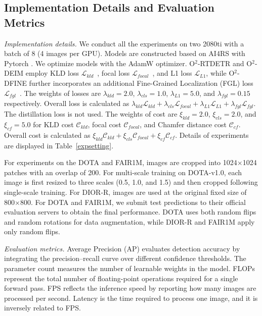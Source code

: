 \documentclass[lettersize,journal]{IEEEtran}
\begin{document}
\DOTAOneResults

\subsection{Implementation Details and Evaluation Metrics}

\textit{Implementation details.}
We conduct all the experiments on two \textcolor[HTML]{76B900}{} 2080ti with a batch of 8 (4 images per GPU). Models are constructed based on AI4RS with Pytorch \textcolor[HTML]{EE4C2C}{}. We optimize models with the AdamW optimizer. O$^2$-RTDETR and O$^2$-DEIM employ KLD loss $\mathcal{L}_{kld}$~\cite{kld}, focal loss $\mathcal{L}_{focal}$~\cite{deim}, and L1 loss $\mathcal{L}_{L1}$, while O$^2$-DFINE further incorporates an additional Fine-Grained Localization (FGL) loss $\mathcal{L}_{fgl}$~\cite{dfine}. The weights of losses are $\lambda_{kld}=2.0$, $\lambda_{cls}=1.0$, $\lambda_{L1}=5.0$, and $\lambda_{fgl}=0.15$ respectively. Overall loss is calculated as $\lambda_{kld}\mathcal{L}_{kld}+\lambda_{cls}\mathcal{L}_{focal}+\lambda_{L1}\mathcal{L}_{L1}+\lambda_{fgl}\mathcal{L}_{fgl}$.  The distillation loss is not used. The weights of cost are $\xi_{kld}=2.0$, $\xi_{cls}=2.0$, and $\xi_{cf}=5.0$ for KLD cost $\mathcal{C}_{kld}$, focal cost $\mathcal{C}_{focal}$, and Chamfer distance cost $\mathcal{C}_{cf}$. Overall cost is calculated as $\xi_{kld}\mathcal{C}_{kld}+\xi_{cls}\mathcal{C}_{focal}+\xi_{cf}\mathcal{C}_{cf}$. Details of experiments are displayed in Table~\ref{expsetting}.

For experiments on the DOTA and FAIR1M, images are cropped into 1024$\times$1024 patches with an overlap of 200. For multi-scale training on DOTA-v1.0, each image is first resized to three scales (0.5, 1.0, and 1.5) and then cropped following single-scale training. For DIOR-R, images are used at the original fixed size of 800$\times$800. For DOTA and FAIR1M, we submit test predictions to their official evaluation servers to obtain the final performance. DOTA uses both random flips and random rotations for data augmentation, while DIOR-R and FAIR1M apply only random flips.


\textit{Evaluation metrics.}
Average Precision (AP) evaluates detection accuracy by integrating the precision–recall curve over different confidence thresholds. The parameter count measures the number of learnable weights in the model. FLOPs represent the total number of floating-point operations required for a single forward pass. FPS reflects the inference speed by reporting how many images are processed per second. Latency is the time required to process one image, and it is inversely related to FPS.
\end{document}
